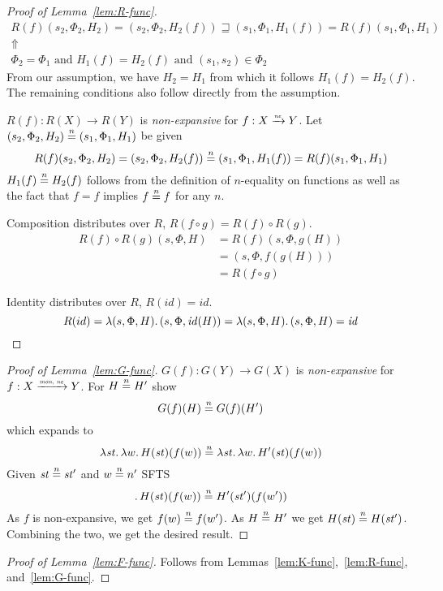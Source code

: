 \documentclass[a4paper]{article}
\newcommand{\monnefun}{\xrightarrow{\textit{\tiny{mon, ne}}}}
\newcommand{\nefun}{\xrightarrow{\textit{\tiny{ne}}}}
\newcommand{\nequal}[1][n]{\stackrel{\tiny{#1}}{=}}
\newcommand{\id}{\var{id}}
\newcommand{\var}[1]{\mathit{#1}}
\newcommand{\future}{\mathbin{\sqsupseteq}}
\begin{document}
\begin{appendices}
\begin{proof}[Proof of Lemma~\ref{lem:R-func}]
    \begin{gather*}
      R(f)(s_2,\Phi_2,H_2) = (s_2,\Phi_2,H_2(f)) \future (s_1,\Phi_1,H_1(f)) = R(f)(s_1,\Phi_1,H_1) \\
      \Uparrow\\
      \Phi_2 = \Phi_1 \text{ and } H_1(f) = H_2(f) \text{ and } (s_1,s_2) \in \Phi_2
    \end{gather*}
    From our assumption, we have $H_2 = H_1$ from which it follows $H_1(f) = H_2(f)$. The remaining conditions also follow directly from the assumption.

    $R(f) : R(X) \rightarrow R(Y)$ is \emph{non-expansive} for $f : X \nefun Y$. Let $(s_2,\Phi_2,H_2) \nequal (s_1,\Phi_1,H_1)$ be given
\[
  R(f)(s_2,\Phi_2,H_2) = (s_2,\Phi_2,H_2(f)) \nequal (s_1,\Phi_1,H_1(f)) = R(f)(s_1,\Phi_1,H_1)
\]
$H_1(f) \nequal H_2(f)$ follows from the definition of $n$-equality on functions as well as the fact that $f=f$ implies $f \nequal f$ for any $n$.

  Composition distributes over $R$, $R(f \circ g) = R(f) \circ R(g)$.
  \begin{align*}
    R(f) \circ R(g)(s,\Phi,H) &= R(f)(s,\Phi,g(H)) \\
                              &= (s,\Phi,f(g(H)))\\
                              &= R(f \circ g)
  \end{align*}

  Identity distributes over $R$, $R(\id) = \id$.
  \[
    R(id) = \lambda (s,\Phi,H) \ldotp  (s,\Phi,\id(H)) = \lambda (s,\Phi,H) \ldotp  (s,\Phi,H) = \id
  \]
\end{proof}

\begin{proof}[Proof of Lemma~\ref{lem:G-func}]
  $G(f) : G(Y) \rightarrow G(X)$ is \emph{non-expansive} for $f : X \monnefun Y$. For $H \nequal H'$ show
  \[
    G(f)(H) \nequal G(f)(H')
  \]
  which expands to
  \[
    \lambda \var{st} \ldotp \lambda w \ldotp H(\var{st})(f(w)) \nequal \lambda \var{st} \ldotp \lambda w \ldotp  H'(\var{st})(f(w))
  \]
  Given $\var{st} \nequal \var{st}'$ and $w \nequal n'$ SFTS
  \[
  \ldotp H(\var{st})(f(w)) \nequal H'(\var{st}')(f(w'))
  \]
  As $f$ is non-expansive, we get $f(w) \nequal f(w')$. As $H \nequal H'$ we get $H(\var{st}) \nequal H(\var{st'})$. Combining the two, we get the desired result.  
\end{proof}

\begin{proof}[Proof of Lemma~\ref{lem:F-func}]
Follows from Lemmas~\ref{lem:K-func},~\ref{lem:R-func}, and~\ref{lem:G-func}.
\end{proof}


\end{appendices}
\end{document}
